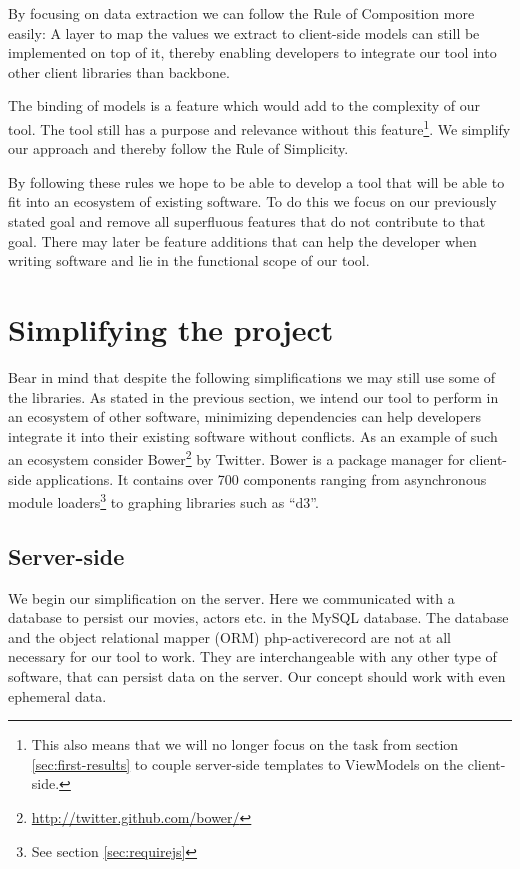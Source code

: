 \documentclass[thesis.tex]{subfiles}
\begin{document}
By focusing on data extraction we can follow the Rule of Composition more
easily: A layer to map the values we extract to client-side models can still be
implemented on top of it, thereby enabling developers to integrate our tool into
other client libraries than backbone.

The binding of models is a feature which would add to the complexity of our
tool. The tool still has a purpose and relevance without this
feature\footnote{This also means that we will no longer focus on the task from
	section \ref{sec:first-results} to couple server-side templates to ViewModels
	on the client-side.}.
We simplify our approach and thereby follow the Rule of Simplicity.

By following these rules we hope to be able to develop a tool that will be able
to fit into an ecosystem of existing software. To do this we focus on our
previously stated goal and remove all superfluous features that do not
contribute to that goal. There may later be feature additions that can help the
developer when writing software and lie in the functional scope of our tool.

\section{Simplifying the project}
\label{sec:simplifying}
Bear in mind that despite the following simplifications we may still use some
of the libraries.
As stated in the previous section, we intend our tool to perform in an ecosystem
of other software, minimizing dependencies can help developers integrate it into
their existing software without conflicts. As an example of such an ecosystem
consider Bower\footnote{\url{http://twitter.github.com/bower/}} by Twitter.
Bower is a package manager for client-side applications. It contains over 700
components ranging from asynchronous module
loaders\footnote{See section \ref{sec:requirejs}} to graphing libraries such
as ``d3''.

\subsection{Server-side}
\label{sec:simple-server}
We begin our simplification on the server. Here we communicated with a database
to persist our movies, actors etc. in the MySQL database. The database and the
object relational mapper (ORM) php-activerecord are not at all necessary for our
tool to work. They are interchangeable with any other type of software, that can
persist data on the server. Our concept should work with even ephemeral data.
\end{document}
